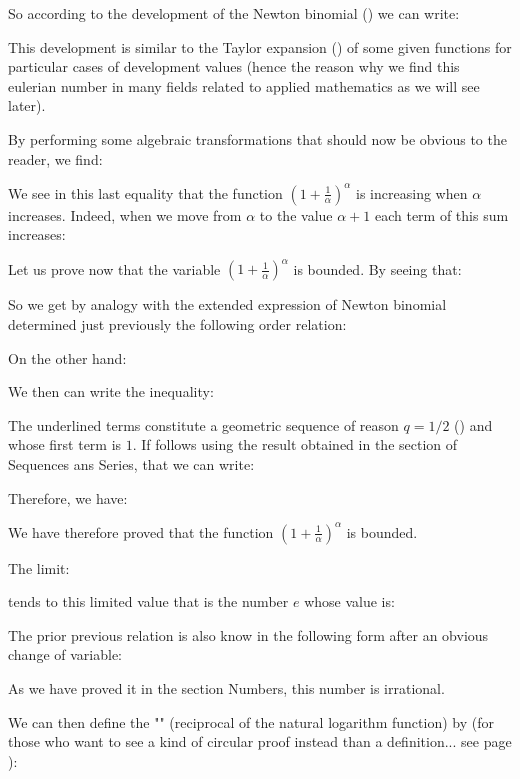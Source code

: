 	So according to the development of the Newton binomial () we can write:
	
	This development is similar to the Taylor expansion () of some given functions for particular cases of development values (hence the reason why we find this eulerian number in many fields related to applied mathematics as we will see later).
	
	By performing some algebraic transformations that should now be obvious to the reader, we find:
	
	We see in this last equality that the function $\left(1+\frac{1}{\alpha}\right)^\alpha$ is increasing when $\alpha$ increases. Indeed, when we move from $\alpha$ to the value $\alpha+1$ each term of this sum increases:
	
	Let us prove now that the variable $\left(1+\frac{1}{\alpha}\right)^\alpha$ is bounded. By seeing that:
	
	So we get by analogy with the extended expression of Newton binomial determined just previously the following order relation:
	
	On the other hand:
	
	We then can write the inequality:
	
	The underlined terms constitute a geometric sequence of reason $q=1/2$ () and whose first term is $1$. If follows using the result obtained in the section of Sequences ans Series, that we can write:
	
	Therefore, we have:
	
	We have therefore proved that the function $\left(1+\frac{1}{\alpha}\right)^\alpha$ is bounded.
	
	The limit:
	
	tends to this limited value that is the number $e$ whose value is:
	
	The prior previous relation is also know in the following form after an obvious change of variable:
	
	\begin{tcolorbox}[title=Remark,arc=10pt,breakable,drop lifted shadow,
  skin=enhanced,
  skin first is subskin of={enhancedfirst}{arc=10pt,no shadow},
  skin middle is subskin of={enhancedmiddle}{arc=10pt,no shadow},
  skin last is subskin of={enhancedlast}{drop lifted shadow}]
	As we have proved it in the section Numbers, this number is irrational.
	\end{tcolorbox}
	We can then define the "\label{natural exponential function}" (reciprocal of the natural logarithm function) by (for those who want to see a kind of circular proof instead than a definition... see page \pageref{definition exponential function}):
	
